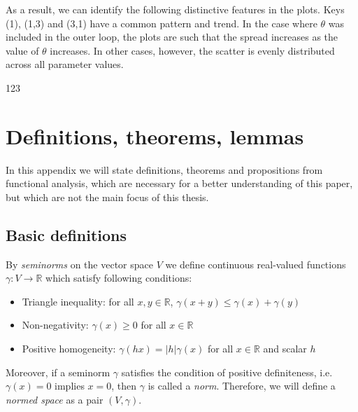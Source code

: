 \documentclass[12pt,a4paper]{report}
\theoremstyle{definition}
\begin{document}
As a result, we can identify the following distinctive features in the plots.
Keys (1), (1,3) and (3,1) have a common pattern and trend. In the case where $\theta$ was included in the outer loop, the plots are such that the spread increases as the value of $\theta$ increases. In other cases, however, the scatter is evenly distributed across all parameter values.






123





\begin{appendix} \label{anhang}
	\chapter{Definitions, theorems, lemmas} %
	
	In this appendix we will state definitions, theorems and propositions from functional analysis, which are necessary for a better understanding of this paper, but which are not the main focus of this thesis.
	
	\section{Basic definitions}
	
	By \textit{seminorms} on the vector space $V$ we define continuous real-valued functions $\gamma:V\rightarrow \mathbb{R}$ which satisfy following conditions:
	
	\begin{itemize}
		\item Triangle inequality: for all $x,y\in \mathbb{R}$, $\gamma(x+y)\leq\gamma(x)+\gamma(y)$ 
		\item Non-negativity: $\gamma(x)\geq0$ for all $x\in \mathbb{R}$
		\item Positive homogeneity: $\gamma(hx)=|h|\gamma(x)$ for all $x\in \mathbb{R}$ and scalar $h$
	\end{itemize}

Moreover, if a seminorm $\gamma$ satisfies the condition of positive definiteness, i.e. $\gamma(x) = 0$ implies $x = 0$, then $\gamma$ is called a \textit{norm}. Therefore, we will define a \textit{normed space} as a pair $(V,\gamma)$.



\end{appendix}
\end{document}

